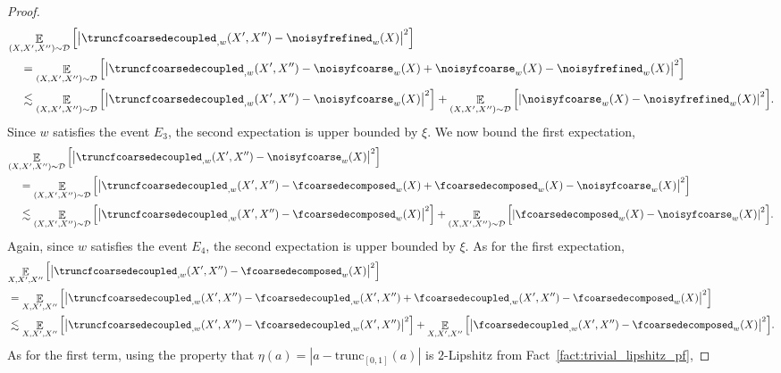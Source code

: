 \documentclass[11pt]{article}
\newcommand\card[1]{\left| {#1} \right|}
\newcommand\Expect[2]{{\mathop{\mathbb{E}}_{#1}\left[ {#2} \right]}}
\newcommand{\V}[1]{{#1}}
\begin{document}
\begin{proof}
\begin{align*}
    &\Expect{(X,X',X'')\sim \mathcal{D}}{\card{\truncfcoarsedecoupled_{,\V w}(X',X'') - \noisyfrefined_{\V w}(X)}^2}\\
    &\quad = \Expect{(X,X',X'')\sim \mathcal{D}}{\card{\truncfcoarsedecoupled_{,\V w}(X',X'') - \noisyfcoarse_{\V w}(X) + \noisyfcoarse_{\V w}(X) - \noisyfrefined_{\V w}(X)}^2}\\
    &\quad \lesssim \Expect{(X,X',X'')\sim \mathcal{D}}{\card{\truncfcoarsedecoupled_{,\V w}(X',X'') - \noisyfcoarse_{\V w}(X)}^2} + \Expect{(X,X',X'')\sim \mathcal{D}}{\card{ \noisyfcoarse_{\V w}(X) - \noisyfrefined_{\V w}(X)}^2}.
\end{align*}
Since $\V w$ satisfies the event $E_3$, the second expectation is upper bounded by $\xi$. We now bound the first expectation,
\begin{align*}
&\Expect{(X,X',X'')\sim \mathcal{D}}{\card{\truncfcoarsedecoupled_{,\V w}(X',X'') - \noisyfcoarse_{\V w}(X)}^2} \\
&\quad = \Expect{(X,X',X'')\sim \mathcal{D}}{\card{\truncfcoarsedecoupled_{,\V w}(X',X'') - \fcoarsedecomposed_{\V w}(X) + \fcoarsedecomposed_{\V w}(X)- \noisyfcoarse_{\V w}(X)}^2} \\
&\quad \lesssim \Expect{(X,X',X'')\sim \mathcal{D}}{\card{\truncfcoarsedecoupled_{,\V w}(X',X'') - \fcoarsedecomposed_{\V w}(X)}^2}  + \Expect{(X,X',X'')\sim \mathcal{D}}{\card{\fcoarsedecomposed_{\V w}(X)- \noisyfcoarse_{\V w}(X)}^2}.
\end{align*}
Again, since $\V w$ satisfies the event $E_4$, the second expectation is upper bounded by $\xi$. As for the first expectation,
 \begin{align}
        &\Expect{X, X', X''}{\card{\truncfcoarsedecoupled_{, \V w} (X',X'') - \fcoarsedecomposed_{\V w}(X)}^2} \nonumber\\
        & = \Expect{X, X', X''}{\card{\truncfcoarsedecoupled_{, \V w}(X',X'') - \fcoarsedecoupled_{, \V w}(X',X'')  + \fcoarsedecoupled_{, \V w}(X',X'') - \fcoarsedecomposed_{\V w}(X)}^2}\nonumber\\
        & \lesssim \Expect{X, X', X''}{\card{\truncfcoarsedecoupled_{, \V w}(X',X'') - \fcoarsedecoupled_{, \V w}(X',X'')}^2} + \Expect{X, X', X''}{\card{\fcoarsedecoupled_{, \V w}(X',X'') - \fcoarsedecomposed_{\V w}(X)}^2}.\label{eq:two_exp_lemma_3wise_decouple}
    \end{align}
%
As for the first term, using the property that $\eta(a) = \card{a-\mathrm{trunc}_{[0,1]}(a)}$ is $2$-Lipshitz from Fact~\ref{fact:trivial_lipshitz_pf},

\end{proof}
\end{document}
